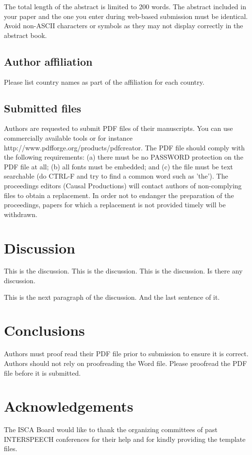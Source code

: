 \documentclass[a4paper]{article}
\begin{document}
The total length of the abstract is limited to 200 words. The
abstract included in your paper and the one you enter during web-based
submission must be identical. Avoid non-ASCII characters or symbols as they
may not display correctly in the abstract book.

\subsection{Author affiliation}
Please list country names as part of the affiliation for each country.

\subsection{Submitted files}
Authors are requested to submit PDF files of their manuscripts. You
can use commercially available tools or for instance
http://www.pdfforge.org/products/pdfcreator.  The PDF file should
comply with the following requirements: (a) there must be no PASSWORD
protection on the PDF file at all; (b) all fonts must be embedded; and
(c) the file must be text searchable (do CTRL-F and try to find a
common word such as 'the'). The proceedings editors (Causal
Productions) will contact authors of non-complying files to obtain a
replacement. In order not to endanger the preparation of the
proceedings, papers for which a replacement is not provided timely
will be withdrawn.

\section{Discussion}
This is the discussion. This is the discussion. This is the discussion.
Is there any discussion.

This is the next paragraph of the discussion. And the last sentence of it.


\section{Conclusions}

Authors must proof read their PDF file prior to submission to ensure it is
correct. Authors should not rely on proofreading the Word file. Please
proofread the PDF file before it is submitted.

\section{Acknowledgements}
The ISCA Board would like to thank the organizing committees of past
INTERSPEECH conferences for their help and for kindly providing the template
files.
\end{document}
